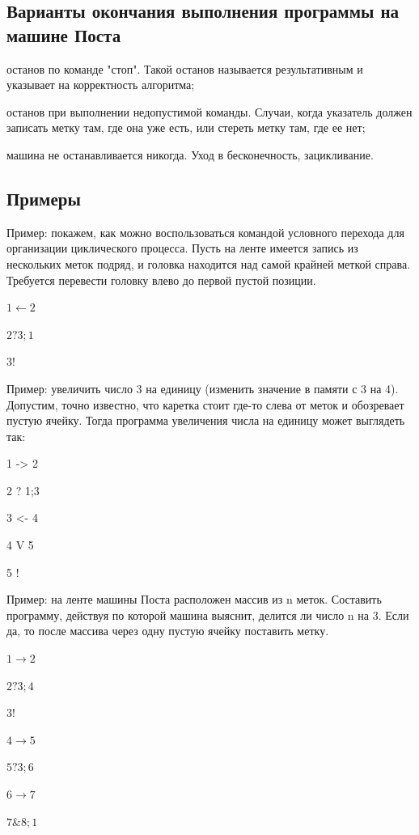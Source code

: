 \documentclass{article}
\begin{document}
\subsection{Варианты окончания выполнения программы на машине Поста}

останов по команде "стоп". 
Такой останов называется результативным и указывает на корректность алгоритма;

останов при выполнении недопустимой команды. 
Случаи, когда указатель должен записать метку там, где она уже есть, 
или стереть метку там, где ее нет;

машина не останавливается никогда. Уход в бесконечность, зацикливание.


\subsection{Примеры}

Пример: покажем, как можно воспользоваться командой условного перехода 
для организации циклического процесса. 
Пусть на ленте имеется запись из нескольких меток подряд, 
и головка находится над самой крайней меткой справа. 
Требуется перевести головку влево до первой пустой позиции.

			$1\leftarrow 2$

			$2 ? 3; 1$

			$3 !$


 Пример: увеличить число 3 на единицу (изменить значение в памяти с 3 на 4). 
 Допустим, точно известно, что каретка стоит где-то слева от меток и обозревает пустую ячейку. 
 Тогда программа увеличения числа на единицу может выглядеть так:

 1 -> 2

 2 ? 1;3

 3 <- 4

 4 V 5

 5 !
 


Пример: на ленте машины Поста расположен массив из n меток. 
Составить программу, действуя по которой машина выяснит, делится ли число n на 3. 
Если да, то после массива через одну пустую ячейку поставить метку.

$1 \rightarrow 2 $

$2 ? 3;4$

$3 !$

$4 \rightarrow 5$

$5 ? 3;6$

$6 \rightarrow 7$

$7 \& 8;1$
\end{document}
